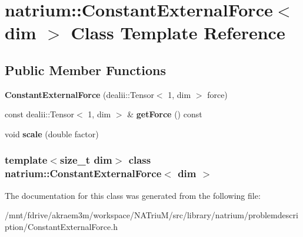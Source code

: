 \hypertarget{classnatrium_1_1ConstantExternalForce}{
\section{natrium::ConstantExternalForce$<$ dim $>$ Class Template Reference}
\label{classnatrium_1_1ConstantExternalForce}
}
\subsection*{Public Member Functions}
\begin{DoxyCompactItemize}
\item 
\hypertarget{classnatrium_1_1ConstantExternalForce_a0938127c8ac6df48dc77733b8049ce59}{
{\bfseries ConstantExternalForce} (dealii::Tensor$<$ 1, dim $>$ force)}
\label{classnatrium_1_1ConstantExternalForce_a0938127c8ac6df48dc77733b8049ce59}

\item 
\hypertarget{classnatrium_1_1ConstantExternalForce_adfefeccb8c20eeeefd0863b20eb5d8eb}{
const dealii::Tensor$<$ 1, dim $>$ \& {\bfseries getForce} () const }
\label{classnatrium_1_1ConstantExternalForce_adfefeccb8c20eeeefd0863b20eb5d8eb}

\item 
\hypertarget{classnatrium_1_1ConstantExternalForce_ab74c3e820ebebda48f5680e4d597f617}{
void {\bfseries scale} (double factor)}
\label{classnatrium_1_1ConstantExternalForce_ab74c3e820ebebda48f5680e4d597f617}

\end{DoxyCompactItemize}
\subsubsection*{template$<$size\_\-t dim$>$ class natrium::ConstantExternalForce$<$ dim $>$}



The documentation for this class was generated from the following file:\begin{DoxyCompactItemize}
\item 
/mnt/fdrive/akraem3m/workspace/NATriuM/src/library/natrium/problemdescription/ConstantExternalForce.h\end{DoxyCompactItemize}
